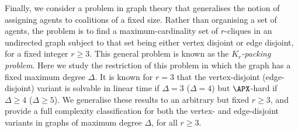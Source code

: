 Finally, we consider a problem in graph theory that generalises the notion of assigning agents to coalitions of a fixed size. Rather than organising a set of agents, the problem is to find a maximum-cardinality set of $r$-cliques in an undirected graph subject to that set being either vertex disjoint or edge disjoint, for a fixed integer $r \geq 3$. This general problem is known as the \emph{$K_r$-packing problem}. Here we study the restriction of this problem in which the graph has a fixed maximum degree $\Delta$. It is known for $r=3$ that the vertex-disjoint (edge-disjoint) variant is solvable in linear time if $\Delta=3$ ($\Delta=4$) but $\APX$-hard if $\Delta \geq 4$ ($\Delta \geq 5$). We generalise these results to an arbitrary but fixed $r \geq 3$, and provide a full complexity classification for both the vertex- and edge-disjoint variants in graphs of maximum degree $\Delta$, for all $r \geq 3$.